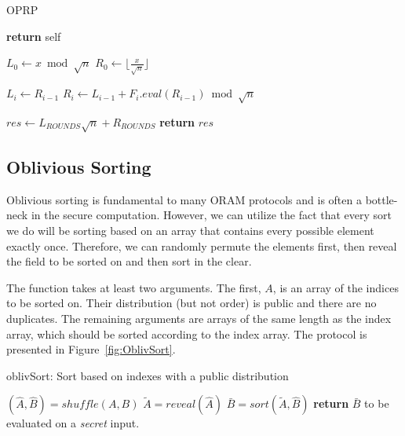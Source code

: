\begin{algorithm}
\caption{OPRP}
\label{alg:oprp}
\begin{algorithmic}[1]

  
\State \textbf{return} self   
\EndProcedure

\State

\State $L_0 \gets x \bmod \sqrt{n}$
\State $R_0 \gets \lfloor \frac{x}{\sqrt{n}} \rfloor$

\State $L_i \gets R_{i-1}$
\State $R_i \gets L_{i-1} + F_{i}.eval(R_{i-1}) \bmod \sqrt{n}$
\EndFor

\State $res \gets L_{ROUNDS}\sqrt{n} + R_{ROUNDS}$
\State \textbf{return} $res$
\EndProcedure

\end{algorithmic}
\end{algorithm}
\subsection{Oblivious Sorting}

Oblivious sorting is fundamental to many ORAM protocols and is often
a bottle-neck in the secure computation.
However, we can utilize the fact that every sort we do will be sorting
based on an array that contains every possible element exactly once.
Therefore, we can randomly permute the elements first,
then reveal the field to be sorted on and then sort in the clear.

The function takes at least two arguments. 
The first, $A$, is an array of the indices to be sorted on.
Their distribution (but not order) is public and there are no duplicates.
The remaining arguments are arrays of the same length as the index array,
which should be sorted according to the index array.
The protocol is presented in Figure~\ref{fig:OblivSort}.


\begin{algorithm}
\caption{oblivSort: Sort based on indexes with a public distribution}
\label{fig:OblivSort}
\begin{algorithmic}[0]

\State $(\hat{A} , \hat{B}) = shuffle(A, B)$
\State $\tilde{A} = reveal(\hat{A})$
\State $\bar{B} = sort(\tilde{A}, \hat{B})$
\State \textbf{return} $\bar{B}$
to be evaluated on a \emph{secret} input.
\EndProcedure

\end{algorithmic}
\end{algorithm}

